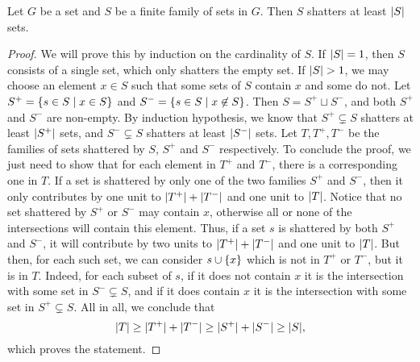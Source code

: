         \begin{lemma} \label{lem:pajor}
            Let $G$ be a set and $S$ be a finite family of sets in $G$.
            Then $S$ shatters at least $| S |$ sets.
            \begin{proof}
                We will prove this by induction on the cardinality of $S$.
                If $| S | = 1$, then $S$ consists of a single set, which only shatters the empty set.
                If $| S | > 1$, we may choose an element $x \in S$ such that some sets of $S$ contain $x$ and some do not.
                Let $S^+ = \{ s \in S \mid x \in S \}$ and $S^- = \{ s \in S \mid x \not\in S \}$.
                Then $S = S^+ \sqcup S^-$, and both $S^+$ and $S^-$ are non-empty.
                By induction hypothesis, we know that $S^+ \subsetneq S$ shatters at least $| S^+ |$ sets,
                and $S^- \subsetneq S$ shatters at least $| S^- |$ sets.
                Let $T, T^+, T^-$ be the families of sets shattered by $S$, $S^+$ and $S^-$ respectively.
                To conclude the proof, we just need to show that for each element in $T^+$ and $T^-$, there is a corresponding
                one in $T$.
                If a set is shattered by only one of the two families $S^+$ and $S^-$, then it only contributes by one unit
                to $| T^+ | + | T^- |$ and one unit to $| T |$.
                Notice that no set shattered by $S^+$ or $S^-$ may contain $x$, otherwise all or none of the intersections
                will contain this element.
                Thus, if a set $s$ is shattered by both $S^+$ and $S^-$, it will contribute by two units to
                $| T^+ | + | T^- |$ and one unit to $| T |$.
                But then, for each such set, we can consider $s \cup \{ x \}$ which is not in $T^+$ or $T^-$, but it is in $T$.
                Indeed, for each subset of $s$, if it does not contain $x$ it is the intersection with some
                set in $S^- \subsetneq S$, and if it does contain $x$ it is the intersection with some set in $S^+ \subsetneq S$.
                All in all, we conclude that
                \[
                    | T | \geq | T^+ | + | T^- | \geq | S^+ | + | S^- |
                                    \geq | S |,
                \]
                which proves the statement.
            \end{proof}
        \end{lemma}

